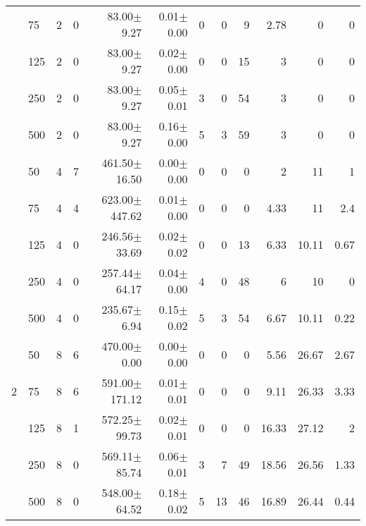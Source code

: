 \documentclass[conference]{IEEEtran}
\begin{document}
\begin{table*}[h]
\begin{center}
\begin{tabular}{c l l c r r r r r r r r}
 &75      &  2   &    0  &  83.00$\pm$9.27      &        0.01$\pm$0.00  &  0  &          0   &            9   &         2.78    &       0       &  0       \\
 &125     &  2   &    0  &  83.00$\pm$9.27      &        0.02$\pm$0.00  &  0  &          0   &            15  &         3       &       0       &  0       \\
 &250     &  2   &    0  &  83.00$\pm$9.27      &        0.05$\pm$0.01  &  3  &          0   &            54  &         3       &       0       &  0       \\
 &500     &  2   &    0  &  83.00$\pm$9.27      &        0.16$\pm$0.00  &  5  &          3   &            59  &         3       &       0       &  0       \\
 &50      &  4   &    7  &  461.50$\pm$16.50    &        0.00$\pm$0.00  &  0  &          0   &            0   &         2       &       11      &  1       \\
 &75      &  4   &    4  &  623.00$\pm$447.62   &        0.01$\pm$0.00  &  0  &          0   &            0   &         4.33    &       11      &  2.4     \\
 &125     &  4   &    0  &  246.56$\pm$33.69    &        0.02$\pm$0.02  &  0  &          0   &            13  &         6.33    &       10.11   &  0.67    \\
 &250     &  4   &    0  &  257.44$\pm$64.17    &        0.04$\pm$0.00  &  4  &          0   &            48  &         6       &       10      &  0       \\
 &500     &  4   &    0  &  235.67$\pm$6.94     &        0.15$\pm$0.02  &  5  &          3   &            54  &         6.67    &       10.11   &  0.22    \\
 &50      &  8   &    6  &  470.00$\pm$0.00     &        0.00$\pm$0.00  &  0  &          0   &            0   &         5.56    &       26.67   &  2.67    \\
2&75      &  8   &    6  &  591.00$\pm$171.12   &        0.01$\pm$0.01  &  0  &          0   &            0   &         9.11    &       26.33   &  3.33    \\
 &125     &  8   &    1  &  572.25$\pm$99.73    &        0.02$\pm$0.01  &  0  &          0   &            0   &         16.33   &       27.12   &  2       \\
 &250     &  8   &    0  &  569.11$\pm$85.74    &        0.06$\pm$0.01  &  3  &          7   &            49  &         18.56   &       26.56   &  1.33    \\
 &500     &  8   &    0  &  548.00$\pm$64.52    &        0.18$\pm$0.02  &  5  &          13  &            46  &         16.89   &       26.44   &  0.44    \\

\end{tabular}
\end{center}
\end{table*}
\end{document}
